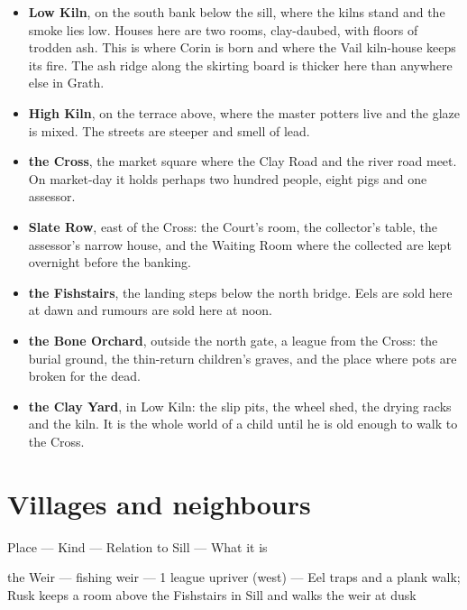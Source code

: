\documentclass{design/chronicle}
\begin{document}
\begin{itemize}[leftmargin=1.4em,itemsep=1pt,topsep=3pt,parsep=0pt]

\item \textbf{Low Kiln}, on the south bank below the sill, where the kilns stand and the smoke lies low. Houses here are two rooms, clay-daubed, with floors of trodden ash. This is where Corin is born and where the Vail kiln-house keeps its fire. The ash ridge along the skirting board is thicker here than anywhere else in Grath.

\item \textbf{High Kiln}, on the terrace above, where the master potters live and the glaze is mixed. The streets are steeper and smell of lead.

\item \textbf{the Cross}, the market square where the Clay Road and the river road meet. On market-day it holds perhaps two hundred people, eight pigs and one assessor.

\item \textbf{Slate Row}, east of the Cross: the Court’s room, the collector’s table, the assessor’s narrow house, and the Waiting Room where the collected are kept overnight before the banking.

\item \textbf{the Fishstairs}, the landing steps below the north bridge. Eels are sold here at dawn and rumours are sold here at noon.

\item \textbf{the Bone Orchard}, outside the north gate, a league from the Cross: the burial ground, the thin-return children’s graves, and the place where pots are broken for the dead.

\item \textbf{the Clay Yard}, in Low Kiln: the slip pits, the wheel shed, the drying racks and the kiln. It is the whole world of a child until he is old enough to walk to the Cross.

\end{itemize}

\section*{Villages and neighbours}

Place — Kind — Relation to Sill — What it is\par

the Weir — fishing weir — 1 league upriver (west) — Eel traps and a plank walk; Rusk keeps a room above the Fishstairs in Sill and walks the weir at dusk\par
\end{document}
